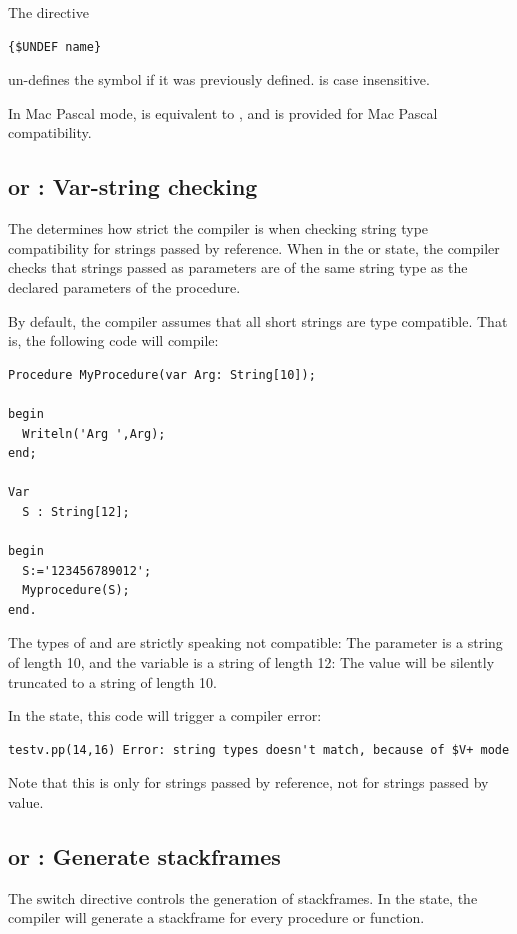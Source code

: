 The directive
\begin{verbatim}
{$UNDEF name}
\end{verbatim}
un-defines the symbol  if it was previously defined.
 is case insensitive.

In Mac Pascal mode,  is equivalent to , and is 
provided for Mac Pascal compatibility.


\subsection{ or  : Var-string checking}

The  determines how strict the compiler is when 
checking string type compatibility for strings passed by reference. When in the \var{+} or  state, 
the compiler checks that strings passed as parameters are of the same string type as the declared
parameters of the procedure.

By default, the compiler assumes that all short strings are type compatible.
That is, the following code will compile:
\begin{verbatim}
Procedure MyProcedure(var Arg: String[10]);

begin
  Writeln('Arg ',Arg);
end;

Var
  S : String[12];

begin
  S:='123456789012';
  Myprocedure(S);
end.
\end{verbatim}
The types of  and  are strictly speaking not compatible:
The  parameter is a string of length 10, and the variable 
is a string of length 12: The value will be silently truncated to a string
of length 10.

In the  state, this code will trigger a compiler error:
\begin{verbatim}
testv.pp(14,16) Error: string types doesn't match, because of $V+ mode
\end{verbatim}
Note that this is only for strings passed by reference, not for strings
passed by value.

\subsection{ or  : Generate stackframes}

The  switch directive controls the generation of stackframes.
In the  state, the compiler will generate a stackframe for every procedure or function.

